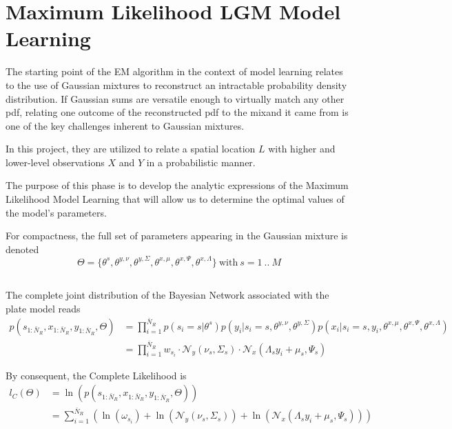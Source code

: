\section{Maximum Likelihood LGM Model Learning}

The starting point of the EM algorithm in the context of model learning relates to the use of Gaussian mixtures to reconstruct an intractable probability density distribution. If Gaussian sums are versatile enough to virtually match any other pdf, relating one outcome of the reconstructed pdf to the mixand it came from is one of the key challenges inherent to Gaussian mixtures. 

In this project, they are utilized to relate a spatial location $L$ with higher and lower-level observations $X$ and $Y$ in a probabilistic manner.

The purpose of this phase is to develop the analytic expressions of the Maximum Likelihood Model Learning that will allow us to determine the optimal values of the model's parameters.

For compactness, the full set of parameters appearing in the Gaussian mixture is denoted
\begin{equation}
\Theta =\{\theta^s,\theta^{y,\nu}, \theta^{y,\Sigma}, \theta^{x,\mu}, \theta^{x,\Psi}, \theta^{x,\Lambda}\}\ \mathrm{with}\ s = 1\ ..\ M
\end{equation}
\subsection{}
The complete joint  distribution of the Bayesian Network associated with the plate model reads
\begin{align}
p(s_{1:\bar{N}_R},x_{1:\bar{N}_R},y_{1:\bar{N}_R},\Theta) &= \prod\limits_{i = 1}^{\bar{N}_R}p(s_i = s\vert\theta^s)
p(y_i\vert s_i = s, \theta^{y,\nu}, \theta^{y,\Sigma})p(x_i\vert s_i = s,y_i, \theta^{x,\mu}, \theta^{x,\Psi}, \theta^{x,\Lambda})
\nonumber \\ &=  \prod\limits_{i = 1}^{\bar{N}_R}w_{s_i}\cdot
\mathcal{N}_y\left(\nu_s,\Sigma_s\right)\cdot\mathcal{N}_x\left(\Lambda_sy_i + \mu_s,\Psi_s\right)
\end{align}

By consequent, the Complete Likelihood is
\begin{align}
l_C(\Theta)& = \ln\left(p(s_{1:\bar{N}_R},x_{1:\bar{N}_R},y_{1:\bar{N}_R},\Theta)\right)\nonumber\\
&= \sum\limits_{i = 1}^{\bar{N}_R}\left(\ln(\omega_{s_i}) + \ln\left(\mathcal{N}_y\left(\nu_s,\Sigma_s\right)\right)+ \ln\left(\mathcal{N}_x\left(\Lambda_sy_i + \mu_s,\Psi_s\right)\right)\right) 
\end{align}

